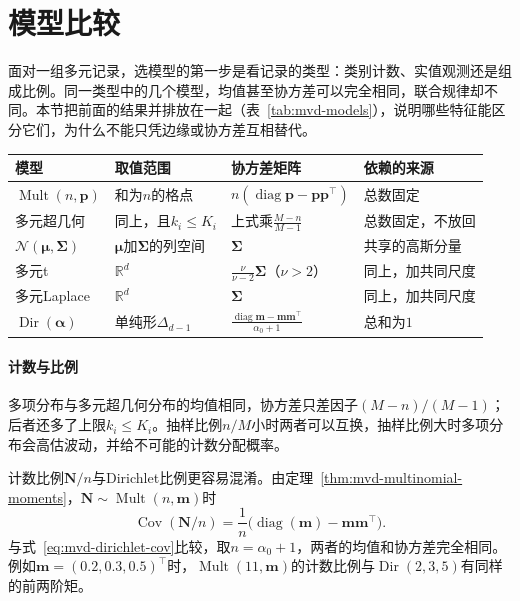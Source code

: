 \section{模型比较}
\label{sec:mvd-comparison}

面对一组多元记录，选模型的第一步是看记录的类型：类别计数、实值观测还是组成比例。同一类型中的几个模型，均值甚至协方差可以完全相同，联合规律却不同。本节把前面的结果并排放在一起（表~\ref{tab:mvd-models}），说明哪些特征能区分它们，为什么不能只凭边缘或协方差互相替代。

\begin{BookInlineTable}
  \centering
  \small
  \begin{tabular}{llll}
    \toprule
    模型 & 取值范围 & 协方差矩阵 & 依赖的来源\\
    \midrule
    $\operatorname{Mult}(n,\bm{p})$ & 和为$n$的格点 & $n(\operatorname{diag}\bm{p}-\bm{p}\bm{p}^{\top})$ & 总数固定\\
    多元超几何 & 同上，且$k_i\leq K_i$ & 上式乘$\frac{M-n}{M-1}$ & 总数固定，不放回\\
    $\mathcal{N}(\bm{\mu},\bm{\Sigma})$ & $\bm{\mu}$加$\bm{\Sigma}$的列空间 & $\bm{\Sigma}$ & 共享的高斯分量\\
    多元t & $\mathbb{R}^{d}$ & $\frac{\nu}{\nu-2}\bm{\Sigma}$（$\nu>2$） & 同上，加共同尺度\\
    多元Laplace & $\mathbb{R}^{d}$ & $\bm{\Sigma}$ & 同上，加共同尺度\\
    $\operatorname{Dir}(\bm{\alpha})$ & 单纯形$\Delta_{d-1}$ & $\frac{\operatorname{diag}\bm{m}-\bm{m}\bm{m}^{\top}}{\alpha_0+1}$ & 总和为$1$\\
    \bottomrule
  \end{tabular}
  \caption{本章五个模型及多元超几何分布的取值范围、协方差与依赖来源。多元t与多元Laplace取$\bm{\Sigma}$正定；Dirichlet中$\bm{m}=\bm{\alpha}/\alpha_0$。}
  \label{tab:mvd-models}
\end{BookInlineTable}

\paragraph{计数与比例}
多项分布与多元超几何分布的均值相同，协方差只差因子$(M-n)/(M-1)$；后者还多了上限$k_i\leq K_i$。抽样比例$n/M$小时两者可以互换，抽样比例大时多项分布会高估波动，并给不可能的计数分配概率。

计数比例$\bm{N}/n$与Dirichlet比例更容易混淆。由定理~\ref{thm:mvd-multinomial-moments}，$\bm{N}\sim\operatorname{Mult}(n,\bm{m})$时
\[
 \operatorname{Cov}(\bm{N}/n)=\frac1n\bigl(\operatorname{diag}(\bm{m})-\bm{m}\bm{m}^{\top}\bigr) .
\]
与式~\eqref{eq:mvd-dirichlet-cov}比较，取$n=\alpha_0+1$，两者的均值和协方差完全相同。例如$\bm{m}=(0.2,0.3,0.5)^{\top}$时，$\operatorname{Mult}(11,\bm{m})$的计数比例与$\operatorname{Dir}(2,3,5)$有同样的前两阶矩。

